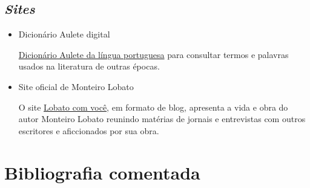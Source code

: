 \documentclass[11pt]{extarticle}
\begin{document}
\subsection{\emph{Sites}}

\begin{itemize}

\item Dicionário Aulete digital

\href{http://www.aulete.com.br/}{Dicionário Aulete da língua portuguesa} para 
consultar termos e palavras usados na literatura de outras épocas.

\item  Site oficial de Monteiro Lobato

O site \href{https://lobato.com.vc//}{Lobato com você}, em formato de 
blog, apresenta a vida e obra do autor Monteiro Lobato 
reunindo matérias de jornais e entrevistas com outros escritores e aficcionados 
por sua obra. 

\end{itemize}

\section{Bibliografia comentada}
\end{document}
